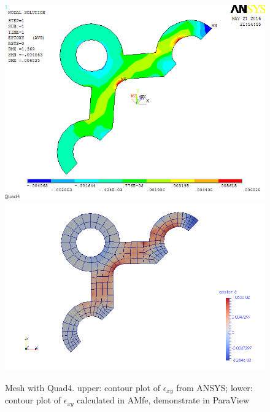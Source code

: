 \begin{figure}[htbp]
	\begin{center}
		\includegraphics[width=13cm,clip]{Quad4_Exy.png} 		
		\includegraphics[width=13cm,clip]{Quad4_Exy_P.png} 		
		\caption{Mesh with Quad4. upper: contour plot of $\epsilon_{xy}$ from ANSYS; lower: contour plot of $\epsilon_{xy}$ calculated in AMfe, demonstrate in ParaView} \label{fig: Quad4_Exy}
	\end{center}
\end{figure}

